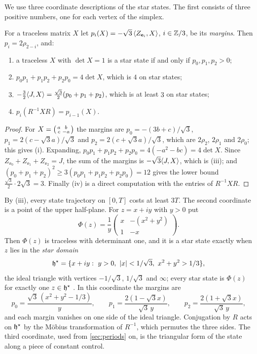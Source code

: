 We use three coordinate descriptions of the star states. The first consists of three positive
numbers, one for each vertex of the simplex.

\begin{lemma}[Margins]\label{lem:margins}
For a traceless matrix $X$ let $p_i(X)=-\sqrt3\,\langle Z_{\mathbf{e}_i},X\rangle$, $i\in\mathbb{Z}/3$, be its
\emph{margins}. Then $p_i=2\rho_{2-i}$, and:
\begin{enumerate}[label=\textup{(\roman*)}]
\item a traceless $X$ with $\det X=1$ is a star state if and only if $p_0,p_1,p_2>0$;
\item $p_0p_1+p_1p_2+p_2p_0=4\det X$, which is $4$ on star states;
\item $-\tfrac32\langle J,X\rangle=\tfrac{\sqrt3}{2}(p_0+p_1+p_2)$, which is at least $3$ on star states;
\item $p_i(R^{-1}XR)=p_{i-1}(X)$.
\end{enumerate}
\end{lemma}

\begin{proof}
For $X=\begin{psmallmatrix}a&b\\c&-a\end{psmallmatrix}$ the margins are $p_0=-(3b+c)/\sqrt3$,
$p_1=2(c-\sqrt3a)/\sqrt3$ and $p_2=2(c+\sqrt3a)/\sqrt3$, which are $2\rho_2$, $2\rho_1$ and
$2\rho_0$; this gives (i). Expanding, $p_0p_1+p_1p_2+p_2p_0=4(-a^2-bc)=4\det X$. Since
$Z_{\ee_0}+Z_{\ee_1}+Z_{\ee_2}=J$, the sum of the margins is $-\sqrt3\langle J,X\rangle$, which is (iii); and
$(p_0+p_1+p_2)^2\ge3(p_0p_1+p_1p_2+p_2p_0)=12$ gives the lower bound
$\tfrac{\sqrt3}{2}\cdot2\sqrt3=3$. Finally (iv) is a direct computation with the entries of
$R^{-1}XR$.
\end{proof}

By (iii), every state trajectory on $[0,T]$ costs at least $3T$. The second coordinate is a point
of the upper half-plane. For $z=x+iy$ with $y>0$ put
\[
  \Phi(z)=\frac1y\begin{pmatrix}x&-(x^2+y^2)\\1&-x\end{pmatrix}.
\]
Then $\Phi(z)$ is traceless with determinant one, and it is a star state exactly when $z$ lies in
the \emph{star domain}
\[
  \hstar=\{x+iy:\ y>0,\ \abs x<1/\sqrt3,\ x^2+y^2>1/3\},
\]
the ideal triangle with vertices $-1/\sqrt3$, $1/\sqrt3$ and $\infty$; every star state is
$\Phi(z)$ for exactly one $z\in\mathfrak{h}^{\star}$ \cite[Thm.~4.4.1]{HalesVajjha2024}. In this coordinate the
margins are
\[
  p_0=\frac{\sqrt3\,(x^2+y^2-1/3)}{y},\qquad p_1=\frac{2(1-\sqrt3x)}{\sqrt3\,y},\qquad
  p_2=\frac{2(1+\sqrt3x)}{\sqrt3\,y},
\]
and each margin vanishes on one side of the ideal triangle. Conjugation by $R$ acts on $\mathfrak{h}^{\star}$ by
the M\"obius transformation of $R^{-1}$, which permutes the three sides. The third coordinate, used
from \cref{sec:periods} on, is the triangular form of the state along a piece of constant control.

